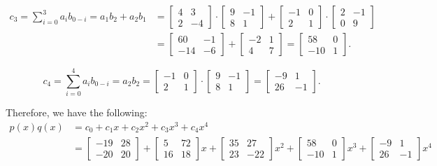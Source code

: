 \begin{align*}
c_3 = \sum_{i = 0}^3 a_i b_{0 - i} = a_1b_2+a_2b_1&= \begin{bmatrix} 
4 & 3 \\
2 & -4
\end{bmatrix} \cdot \begin{bmatrix} 
9 & -1\\
8 & 1
\end{bmatrix}+ \begin{bmatrix} 
-1 & 0\\
2 & 1
\end{bmatrix} \cdot\begin{bmatrix}
2 & -1\\
0 & 9
\end{bmatrix}\\
&=\begin{bmatrix}
60 & -1\\
-14 & -6
\end{bmatrix}+\begin{bmatrix}
-2 & 1\\
4 & 7
\end{bmatrix}=\begin{bmatrix}
58 & 0\\
-10 & 1
\end{bmatrix} .
\end{align*}

\[c_4 = \sum_{i = 0}^4 a_i b_{0 - i} = a_2b_2= \begin{bmatrix} 
-1 & 0 \\
2 & 1
\end{bmatrix} \cdot \begin{bmatrix} 
9 & -1\\
8 & 1
\end{bmatrix}=\begin{bmatrix}
-9 & 1\\
26 & -1
\end{bmatrix}.\]
\medskip

\noindent Therefore, we have the following:
\begin{align*}
p(x)q(x) &=c_0+c_1x+c_2x^2+c_3x^3+c_4x^4\\
&=\begin{bmatrix} 
-19 & 28  \\
-20 & 20 
\end{bmatrix}+
\begin{bmatrix} 
5 & 72 \\
16 & 18
\end{bmatrix}x+
\begin{bmatrix} 
35 &27 \\
23 & -22
\end{bmatrix}x^2+
\begin{bmatrix} 
58 & 0 \\
-10 & 1
\end{bmatrix}x^3+
\begin{bmatrix} 
-9 & 1 \\
26 & -1 
\end{bmatrix}x^4
\end{align*}

